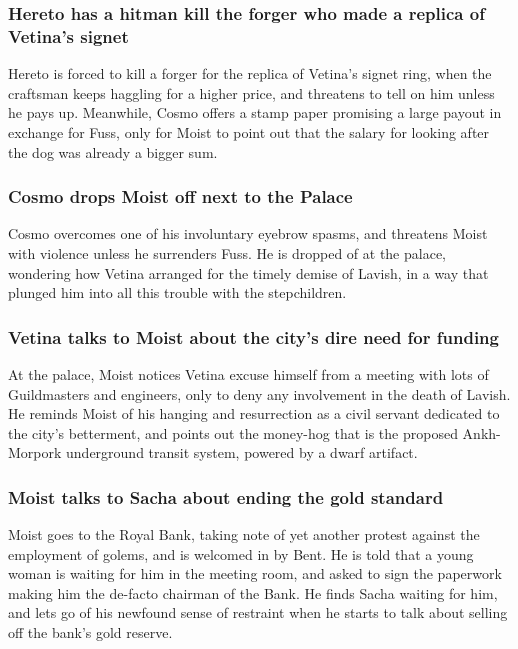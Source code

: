 \subsubsection{\Gls{Hereto} has a hitman kill the forger who made a replica of \Gls{Vetina}'s
    signet}
\Gls{Hereto} is forced to kill a forger for the replica of \Gls{Vetina}'s signet ring, when the
craftsman keeps haggling for a higher price, and threatens to tell on him unless he pays up.
Meanwhile, \Gls{Cosmo} offers a stamp paper promising a large payout in exchange for \Gls{Fuss},
only for \Gls{Moist} to point out that the salary for looking after the dog was already a bigger
sum.

\subsubsection{\Gls{Cosmo} drops \Gls{Moist} off next to the Palace}
\Gls{Cosmo} overcomes one of his involuntary eyebrow spasms, and threatens \Gls{Moist} with violence
unless he surrenders \Gls{Fuss}. He is dropped of at the palace, wondering how \Gls{Vetina} arranged
for the timely demise of \Gls{Lavish}, in a way that plunged him into all this trouble with the
stepchildren.

\subsubsection{\Gls{Vetina} talks to \Gls{Moist} about the city's dire need for funding}
At the palace, \Gls{Moist} notices \Gls{Vetina} excuse himself from a meeting with lots of
Guildmasters and engineers, only to deny any involvement in the death of \Gls{Lavish}. He reminds
\Gls{Moist} of his hanging and resurrection as a civil servant dedicated to the city's betterment,
and points out the money-hog that is the proposed Ankh-Morpork underground transit system, powered
by a dwarf artifact.

\subsubsection{\Gls{Moist} talks to \Gls{Sacha} about ending the gold standard}
\Gls{Moist} goes to the Royal Bank, taking note of yet another protest against the employment of
golems, and is welcomed in by \Gls{Bent}. He is told that a young woman is waiting for him in the
meeting room, and asked to sign the paperwork making him the de-facto chairman of the Bank. He
finds \Gls{Sacha} waiting for him, and lets go of his newfound sense of restraint when he starts to
talk about selling off the bank's gold reserve.


